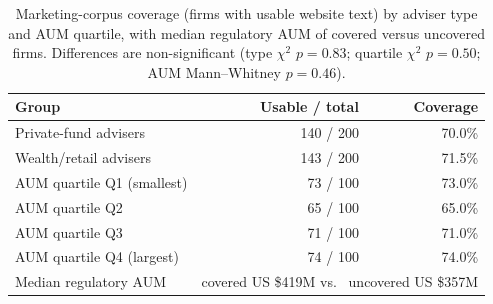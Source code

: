 \documentclass[utf8]{FrontiersinHarvard} %
\begin{document}
\begin{table}[!ht]
\caption{Marketing-corpus coverage (firms with usable website text) by adviser type and AUM quartile, with median regulatory AUM of covered versus uncovered firms. Differences are non-significant (type $\chi^2$ $p = 0.83$; quartile $\chi^2$ $p = 0.50$; AUM Mann--Whitney $p = 0.46$).}
\label{tab:missingness}
\centering
\begin{tabular}{lrr}
\toprule
Group & Usable / total & Coverage \\
\midrule
Private-fund advisers & 140 / 200 & 70.0\% \\
Wealth/retail advisers & 143 / 200 & 71.5\% \\
AUM quartile Q1 (smallest) & 73 / 100 & 73.0\% \\
AUM quartile Q2 & 65 / 100 & 65.0\% \\
AUM quartile Q3 & 71 / 100 & 71.0\% \\
AUM quartile Q4 (largest) & 74 / 100 & 74.0\% \\
Median regulatory AUM & \multicolumn{2}{r}{covered US \$419M \; vs.\ \; uncovered US \$357M} \\
\bottomrule
\end{tabular}
\end{table}
\end{document}

